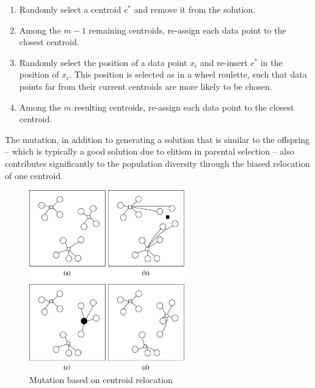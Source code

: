 \begin{enumerate}

	\item Randomly select a centroid $c^{*}$ and remove it from the solution.
	
	\item Among the $m-1$ remaining centroids, re-assign each data point to the closest centroid.
	
	\item Randomly select the position of a data point $x_i$ and re-insert $c^{*}$ in the position of $x_i$. This position is selected as in a wheel roulette, such that data points far from their current centroids are more likely to be chosen.
	
	\item Among the $m$ resulting centroids, re-assign each data point to the closest centroid.
		
\end{enumerate}

The mutation, in addition to generating a solution that is similar to the offspring -- which is typically a good solution due to elitism in parental selection -- also contributes significantly to the population diversity through the biased relocation of one centroid.

\begin{figure}[H]
  \begin{center}
    \includegraphics[width=0.6\textwidth]{img/mutation}
    \caption{Mutation based on centroid relocation}\label{fig:mutation}
  \end{center}
\end{figure}

